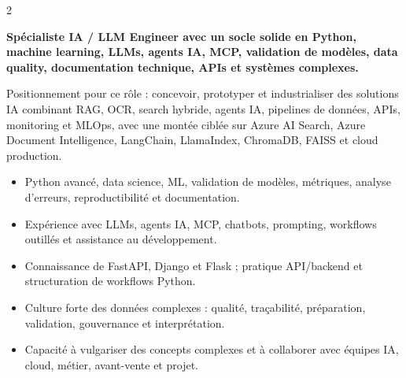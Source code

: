 \documentclass[8pt,a4paper,ragged2e,withhyper]{altacv}
\begin{document}
\begin{paracol}{2}
\switchcolumn


\textbf{Spécialiste IA / LLM Engineer avec un socle solide en Python, machine learning, LLMs, agents IA, MCP, validation de modèles, data quality, documentation technique, APIs et systèmes complexes.}

Positionnement pour ce rôle : concevoir, prototyper et industrialiser des solutions IA combinant RAG, OCR, search hybride, agents IA, pipelines de données, APIs, monitoring et MLOps, avec une montée ciblée sur Azure AI Search, Azure Document Intelligence, LangChain, LlamaIndex, ChromaDB, FAISS et cloud production.

\begin{itemize}
  \item Python avancé, data science, ML, validation de modèles, métriques, analyse d’erreurs, reproductibilité et documentation.
  \item Expérience avec LLMs, agents IA, MCP, chatbots, prompting, workflows outillés et assistance au développement.
  \item Connaissance de FastAPI, Django et Flask ; pratique API/backend et structuration de workflows Python.
  \item Culture forte des données complexes : qualité, traçabilité, préparation, validation, gouvernance et interprétation.
  \item Capacité à vulgariser des concepts complexes et à collaborer avec équipes IA, cloud, métier, avant-vente et projet.
\end{itemize}


\divider
{}
\divider

\medskip



\divider


\divider


\divider



\end{paracol}
\end{document}
